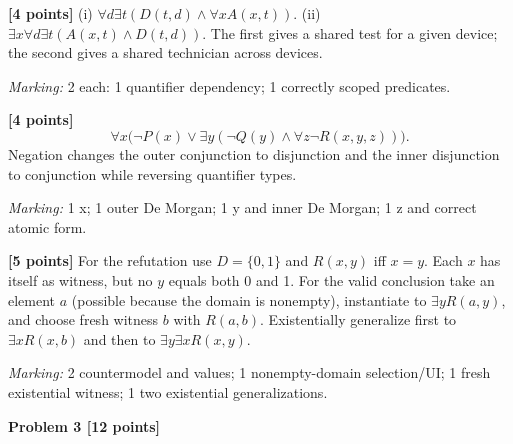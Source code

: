 \documentclass[12pt,letterpaper]{article}
\newcommand{\problemheading}[2][5\baselineskip]{\Needspace{#1}\par\noindent\hspace*{-0.625in}\textbf{#2}\par\nobreak\vspace{0.3em}}
\begin{document}
\begin{description}[font=\normalfont,leftmargin=1.2em,labelsep=0.4em]
\item[(a)] \textbf{[4 points]} (i) $\forall d\exists t(D(t,d)\land\forall xA(x,t))$. (ii) $\exists x\forall d\exists t(A(x,t)\land D(t,d))$. The first gives a shared test for a given device; the second gives a shared technician across devices.
\par\textit{Marking:} 2 each: 1 quantifier dependency; 1 correctly scoped predicates.
\item[(b)] \textbf{[4 points]} \[\forall x\bigl(\neg P(x)\lor\exists y(\neg Q(y)\land\forall z\neg R(x,y,z))\bigr).\] Negation changes the outer conjunction to disjunction and the inner disjunction to conjunction while reversing quantifier types.
\par\textit{Marking:} 1 x; 1 outer De Morgan; 1 y and inner De Morgan; 1 z and correct atomic form.
\item[(c)] \textbf{[5 points]} For the refutation use $D=\{0,1\}$ and $R(x,y)$ iff $x=y$. Each $x$ has itself as witness, but no $y$ equals both 0 and 1. For the valid conclusion take an element $a$ (possible because the domain is nonempty), instantiate to $\exists yR(a,y)$, and choose fresh witness $b$ with $R(a,b)$. Existentially generalize first to $\exists xR(x,b)$ and then to $\exists y\exists xR(x,y)$.
\par\textit{Marking:} 2 countermodel and values; 1 nonempty-domain selection/UI; 1 fresh existential witness; 1 two existential generalizations.
\end{description}
\vspace{0.65em}
\problemheading[\dimexpr 3\baselineskip+4\baselineskip\relax]{Problem 3 [12 points]}
\end{document}
